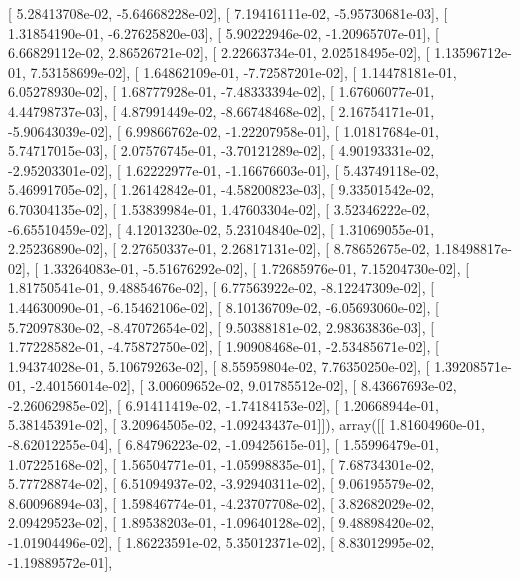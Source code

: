 \documentclass{article}
\begin{document}
       [  5.28413708e-02,  -5.64668228e-02],
       [  7.19416111e-02,  -5.95730681e-03],
       [  1.31854190e-01,  -6.27625820e-03],
       [  5.90222946e-02,  -1.20965707e-01],
       [  6.66829112e-02,   2.86526721e-02],
       [  2.22663734e-01,   2.02518495e-02],
       [  1.13596712e-01,   7.53158699e-02],
       [  1.64862109e-01,  -7.72587201e-02],
       [  1.14478181e-01,   6.05278930e-02],
       [  1.68777928e-01,  -7.48333394e-02],
       [  1.67606077e-01,   4.44798737e-03],
       [  4.87991449e-02,  -8.66748468e-02],
       [  2.16754171e-01,  -5.90643039e-02],
       [  6.99866762e-02,  -1.22207958e-01],
       [  1.01817684e-01,   5.74717015e-03],
       [  2.07576745e-01,  -3.70121289e-02],
       [  4.90193331e-02,  -2.95203301e-02],
       [  1.62222977e-01,  -1.16676603e-01],
       [  5.43749118e-02,   5.46991705e-02],
       [  1.26142842e-01,  -4.58200823e-03],
       [  9.33501542e-02,   6.70304135e-02],
       [  1.53839984e-01,   1.47603304e-02],
       [  3.52346222e-02,  -6.65510459e-02],
       [  4.12013230e-02,   5.23104840e-02],
       [  1.31069055e-01,   2.25236890e-02],
       [  2.27650337e-01,   2.26817131e-02],
       [  8.78652675e-02,   1.18498817e-02],
       [  1.33264083e-01,  -5.51676292e-02],
       [  1.72685976e-01,   7.15204730e-02],
       [  1.81750541e-01,   9.48854676e-02],
       [  6.77563922e-02,  -8.12247309e-02],
       [  1.44630090e-01,  -6.15462106e-02],
       [  8.10136709e-02,  -6.05693060e-02],
       [  5.72097830e-02,  -8.47072654e-02],
       [  9.50388181e-02,   2.98363836e-03],
       [  1.77228582e-01,  -4.75872750e-02],
       [  1.90908468e-01,  -2.53485671e-02],
       [  1.94374028e-01,   5.10679263e-02],
       [  8.55959804e-02,   7.76350250e-02],
       [  1.39208571e-01,  -2.40156014e-02],
       [  3.00609652e-02,   9.01785512e-02],
       [  8.43667693e-02,  -2.26062985e-02],
       [  6.91411419e-02,  -1.74184153e-02],
       [  1.20668944e-01,   5.38145391e-02],
       [  3.20964505e-02,  -1.09243437e-01]]), array([[  1.81604960e-01,  -8.62012255e-04],
       [  6.84796223e-02,  -1.09425615e-01],
       [  1.55996479e-01,   1.07225168e-02],
       [  1.56504771e-01,  -1.05998835e-01],
       [  7.68734301e-02,   5.77728874e-02],
       [  6.51094937e-02,  -3.92940311e-02],
       [  9.06195579e-02,   8.60096894e-03],
       [  1.59846774e-01,  -4.23707708e-02],
       [  3.82682029e-02,   2.09429523e-02],
       [  1.89538203e-01,  -1.09640128e-02],
       [  9.48898420e-02,  -1.01904496e-02],
       [  1.86223591e-02,   5.35012371e-02],
       [  8.83012995e-02,  -1.19889572e-01],
\end{document}

